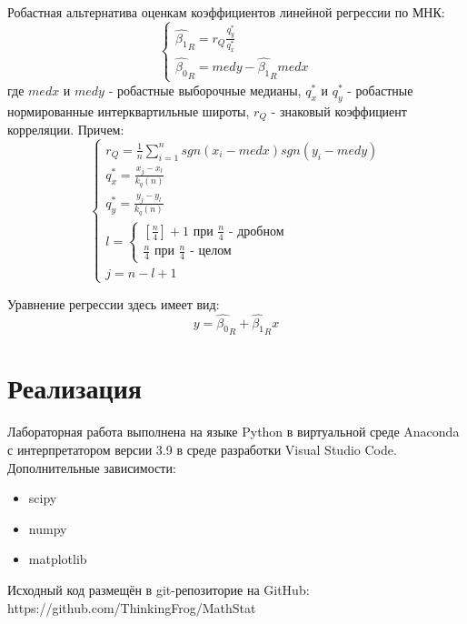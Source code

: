 \documentclass[12pt,a4paper]{article}
\begin{document}
Робастная альтернатива оценкам коэффициентов линейной регрессии по МНК:
\begin{equation}
    \left\{
    \begin{array}{ll}
        \hat{\beta_1}_R=r_Q\frac{q^*_y}{q^*_x}\\
        \hat{\beta_0}_R=medy-\hat{\beta_1}_R medx
    \end{array}
    \right.
\end{equation}
где $med x$ и $med y$ - робастные выборочные медианы, $q^*_x$ и $q^*_y$ - робастные нормированные интерквартильные широты, $r_Q$ - знаковый коэффициент корреляции. Причем:
\begin{equation}
    \left\{
    \begin{array}{ll}
        r_Q=\frac{1}{n}\sum_{i=1}^n{sgn(x_i-medx)sgn(y_i-medy)}\\
        q^*_x=\frac{x_j-x_l}{k_q(n)}\\
        q^*_y=\frac{y_j-y_l}{k_q(n)}\\
        l=\begin{cases}
                [\frac{n}{4}]+1\text{ при }\frac{n}{4}\text{ - дробном}\\ 
                \frac{n}{4}\text{ при }\frac{n}{4}\text{ - целом}
            \end{cases}\\
        j=n-l+1
    \end{array}
    \right.
\end{equation}

Уравнение регрессии здесь имеет вид:
\begin{equation}
    y=\hat{\beta_0}_R+\hat{\beta_1}_Rx
\end{equation}

\section{Реализация}
Лабораторная работа выполнена на языке Python в виртуальной среде Anaconda с интерпретатором версии 3.9 в среде разработки Visual Studio Code. Дополнительные зависимости:
\begin{itemize}
    \item scipy
    \item numpy
    \item matplotlib
\end{itemize}

Исходный код размещён в git-репозиторие на GitHub: \\ https://github.com/ThinkingFrog/MathStat
\end{document}
